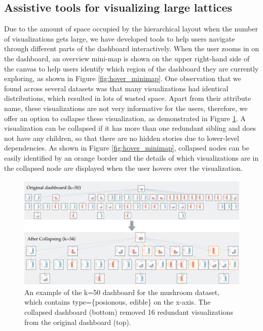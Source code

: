 \subsection{Assistive tools for visualizing large lattices\label{sec:navigation}}
Due to the amount of space occupied by the hierarchical layout when the number of visualizations gets large, we have developed tools to help users navigate through different parts of the dashboard interactively.
  When the user zooms in on the dashboard, an overview mini-map is shown on the upper right-hand side of the canvas to help users identify which region of the dashboard they are currently exploring, as shown in Figure \ref{fig:hover_minimap}.
One observation that we found across several datasets was that many visualizations had identical distributions, which resulted in lots of wasted space. Apart from their attribute name, these visualizations are not very informative for the users, therefore, we offer an option to collapse these visualization, as demonstrated in Figure \ref{fig:collapse_demo}. A visualization can be collapsed if it has more than one redundant sibling and does not have any children, so that there are no hidden stories due to lower-level dependencies. As shown in Figure \ref{fig:hover_minimap}, collapsed nodes can be easily identified by an orange border and the details of which visualizations are in the collapsed node are displayed when the user hovers over the visualization.
\begin{figure}[ht!]
\centering
\includegraphics[width=\linewidth]{figures/collapsed_example.png}
\caption{An example of the k=50 dashboard for the mushroom dataset\cite{mushroom}, which contains type=\{posionous, edible\} on the x-axis. The collapsed dashboard (bottom) removed 16 redundant visualizations from the original dashboard (top).}
\label{fig:collapse_demo}
\end{figure}
